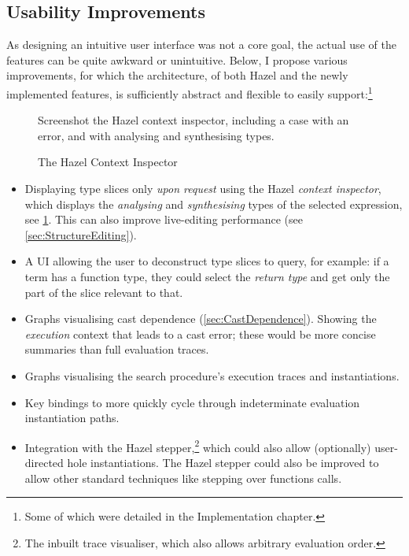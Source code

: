 \subsection{Usability Improvements}\label{sec:UIImprovements}
As designing an intuitive user interface was not a core goal, the actual use of the features can be quite awkward or unintuitive. Below, I propose various improvements, for which the architecture, of both Hazel and the newly implemented features, is sufficiently abstract and flexible to easily support:\footnote{Some of which were detailed in the Implementation chapter.}

\begin{figure}\centering
Screenshot the Hazel context inspector, including a case with an error, and with analysing and synthesising types.
\caption{The Hazel Context Inspector}
\label{fig:ContextInspector}
\end{figure}

\begin{itemize}
\item Displaying type slices only \textit{upon request} using the Hazel \textit{context inspector}, which displays the \textit{analysing} and \textit{synthesising} types of the selected expression, see \cref{fig:ContextInspector}. This can also improve live-editing performance (see \cref{sec:StructureEditing}).
\item A UI allowing the user to deconstruct type slices to query, for example: if a term has a function type, they could select the \textit{return type} and get only the part of the slice relevant to that.
\item Graphs visualising cast dependence (\cref{sec:CastDependence}). Showing the \textit{execution} context that leads to a cast error; these would be more concise summaries than full evaluation traces.
\item Graphs visualising the search procedure's execution traces and instantiations.
\item Key bindings to more quickly cycle through indeterminate evaluation instantiation paths.
\item Integration with the Hazel stepper,\footnote{The inbuilt trace visualiser, which also allows arbitrary evaluation order.} which could also allow (optionally) user-directed hole instantiations. The Hazel stepper could also be improved to allow other standard techniques like stepping over functions calls.
\end{itemize}
